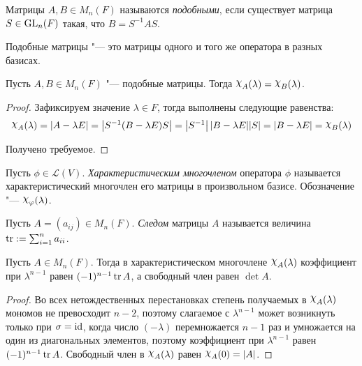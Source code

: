 \begin{definition}
	Матрицы $A, B \in M_n(F)$ называются \textit{подобными}, если существует матрица $S \in \operatorname{GL}_n(F)$ такая, что $B = S^{-1}AS$.
\end{definition}

\begin{note}
	Подобные матрицы "--- это матрицы одного и того же оператора в разных базисах.
\end{note}

\begin{proposition}
	Пусть $A, B \in M_n(F)$ "--- подобные матрицы. Тогда $\Chi_A(\lambda) = \Chi_B(\lambda)$.
\end{proposition}

\begin{proof}
	Зафиксируем значение $\lambda \in F$, тогда выполнены следующие равенства:
	\[\Chi_A(\lambda) = |A - \lambda E| = \left|S^{-1}(B - \lambda E)S\right| = \left|S^{-1}\right||B - \lambda E||S| = |B - \lambda E| = \Chi_B(\lambda)\]
	
	Получено требуемое.
\end{proof}

\begin{definition}
	Пусть $\phi \in \mathcal{L}(V)$. \textit{Характеристическим многочленом} оператора $\phi$ называется характеристический многочлен его матрицы в произвольном базисе. Обозначение "--- $\Chi_\phi(\lambda)$.
\end{definition}

\begin{definition}
	Пусть $A = (a_{ij}) \in M_n(F)$. \textit{Следом} матрицы $A$ называется величина $\operatorname{tr} := \sum_{i = 1}^na_{ii}$.
\end{definition}

\begin{proposition}
	Пусть $A \in M_n(F)$. Тогда в характеристическом многочлене $\Chi_A(\lambda)$ коэффициент при $\lambda^{n - 1}$ равен $(-1)^{n - 1}\operatorname{tr}{A}$, а свободный член равен $\det{A}$.
\end{proposition}

\begin{proof}
	Во всех нетождественных перестановках степень получаемых в $\Chi_A(\lambda)$ мономов не превосходит $n - 2$, поэтому слагаемое с $\lambda^{n - 1}$ может возникнуть только при $\sigma = \mathrm{id}$, когда число $(-\lambda)$ перемножается $n - 1$ раз и умножается на один из диагональных элементов, поэтому коэффициент при $\lambda^{n - 1}$ равен $(-1)^{n - 1}\operatorname{tr}{A}$. Свободный член в $\Chi_A(\lambda)$ равен $\Chi_A(0) = |A|$.
\end{proof}

